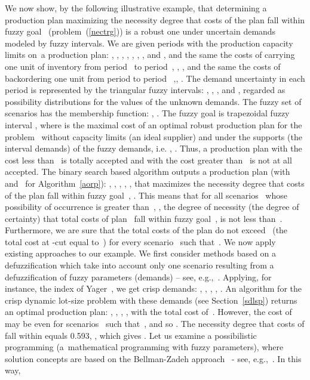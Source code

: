 \documentclass[11pt]{article}
\begin{document}
We now show, by the following illustrative example, that determining a production
plan maximizing  the necessity degree that costs of the plan fall within 
fuzzy goal~ (problem~(\ref{nectrg})) is a robust one under uncertain
demands modeled by fuzzy intervals.
We are given  periods with 
the production capacity limits on~a production plan:
, ,  , ,
, , ,  and , 
and the same 
the costs of carrying one unit
of inventory from period~ to period~, ,
, and the same 
the costs of
backordering one unit from period  to period~ ,, .
The demand uncertainty in each period is represented by the 
triangular fuzzy intervals: , 
 ,  , 
   and  ,
  regarded as
possibility distributions
for the values of the unknown demands.
The fuzzy set of scenarios has the membership function:
,
 . The fuzzy goal  is   trapezoidal  fuzzy interval 
,
where   is the maximal cost of an optimal robust production 
plan for the problem~ without capacity limits 
(an ideal supplier)
and under  the supports (the interval demands)
of the fuzzy demands, i.e. , .
Thus, a production plan with the cost less than~ is totally accepted and
with the cost greater than~ is not at all accepted.
The binary search based algorithm outputs 
a production plan (with ~ and~ for Algorithm~\ref{aorp}):
, ,  ,
,  ,
that maximizes the necessity degree that costs of the plan fall within 
fuzzy goal~, .
This means that
 for all scenarios~ whose possibility of occurrence is greater than~,
 , 
the  degree of necessity (the degree of certainty) that total  costs of plan~ fall within 
fuzzy goal~, is not less than~. Furthermore, we are sure that
the total costs of the plan
do not exceed~ (the total cost  at -cut equal to~)
for every scenario~ such that~.
We now apply existing approaches to our example.
We first consider methods based on a defuzzification which take into account 
only one scenario resulting  from a defuzzification of fuzzy parameters (demands)
-- see, e.g.,~\cite{PMPV09,PMJB10}.
Applying, for instance, the index of Yager~\cite{Y81},
we get crisp demands: 
 , 
, , ,
 . An algorithm for the crisp dynamic lot-size problem with
 these demands (see Section~\ref{sdlsp}) returns an optimal production
 plan:
 , ,  ,
,   with the total cost of~.
However,  the cost of   may be even  for scenarios~
such that~, and so .
The necessity degree that costs of  fall within 
 equals 0.593, ,
which gives
.
Let us examine 
a possibilistic programming  (a~mathematical programming with fuzzy parameters),
where  solution concepts are based on the Bellman-Zadeh approach~\cite{BZ70}
- see, e.g.,~\cite{MPP10,TRGZ07}. In this way,
\end{document}
